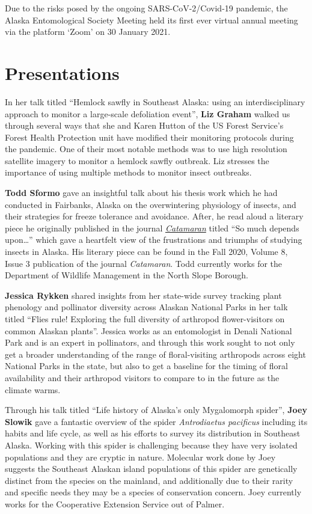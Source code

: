 \begin{multicols}{2} 

Due to the risks posed by the ongoing SARS-CoV-2/Covid-19 pandemic, the Alaska Entomological Society Meeting held its first ever virtual annual meeting via the platform ‘Zoom’ on 30 January 2021. 

\section{Presentations}

In her talk titled ``Hemlock sawfly in Southeast Alaska: using an interdisciplinary approach to monitor a large-scale defoliation event'', \textbf{Liz Graham} walked us through several ways that she and Karen Hutton of the US Forest Service’s Forest Health Protection unit have modified their monitoring protocols during the pandemic. One of their most notable methods was to use high resolution satellite imagery to monitor a hemlock sawfly outbreak. Liz stresses the importance of using multiple methods to monitor insect outbreaks.

\textbf{Todd Sformo} gave an insightful talk about his thesis work which he had conducted in Fairbanks, Alaska on the overwintering physiology of insects, and their strategies for freeze tolerance and avoidance. After, he read aloud a literary piece he originally published in the journal \href{https://catamaranliteraryreader.com/}{\textit{Catamaran}} titled ``So much depends upon\ldots{}'' which gave a heartfelt view of the frustrations and triumphs of studying insects in Alaska. His literary piece can be found in the Fall 2020, Volume 8, Issue 3 publication of the journal \textit{Catamaran}. Todd currently works for the Department of Wildlife Management in the North Slope Borough. 

\textbf{Jessica Rykken} shared insights from her state-wide survey tracking plant phenology and pollinator diversity across Alaskan National Parks in her talk titled ``Flies rule! Exploring the full diversity of arthropod flower-visitors on common Alaskan plants''. Jessica works as an entomologist in Denali National Park and is an expert in pollinators, and through this work sought to not only get a broader understanding of the range of floral-visiting arthropods across eight National Parks in the state, but also to get a baseline for the timing of floral availability and their arthropod visitors to compare to in the future as the climate warms. 

Through his talk titled ``Life history of Alaska’s only Mygalomorph spider'', \textbf{Joey Slowik} gave a fantastic overview of the spider \textit{Antrodiaetus pacificus} including its habits and life cycle, as well as his efforts to survey its distribution in Southeast Alaska. Working with this spider is challenging because they have very isolated populations and they are cryptic in nature. Molecular work done by Joey suggests the Southeast Alaskan island populations of this spider are genetically distinct from the species on the mainland, and additionally due to their rarity and specific needs they may be a species of conservation concern. Joey currently works for the  Cooperative Extension Service out of Palmer. 


\end{multicols}
